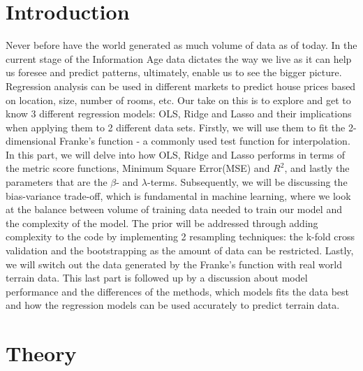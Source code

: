 \documentclass[aps,rmp,reprint,amsmath,amssymb,graphicx,longbibliography]{revtex4-1}
\begin{document}
\maketitle
\def\thefootnote{*}\def\thefootnote{\arabic{footnote}}



\section{Introduction}

    Never before have the world generated as much volume of data as of today. In the current stage of the Information Age data dictates the way we live as it can help us foresee and predict patterns, ultimately, enable us to see the bigger picture. Regression analysis can be used in different markets to predict house prices based on location, size, number of rooms, etc.
    Our take on this is to explore and get to know 3 different regression models: OLS, Ridge and Lasso and their implications when applying them to 2 different data sets.
    Firstly, we will use them to fit the 2-dimensional Franke's function - a commonly used test function for interpolation. In this part, we will delve into how OLS, Ridge and Lasso performs in terms of the metric score functions, Minimum Square Error(MSE) and $R^2$, and lastly the parameters that are the $\beta$- and $\lambda$-terms. Subsequently, we will be discussing the bias-variance trade-off, which is fundamental in machine learning, where we look at the balance between volume of training data needed to train our model and the complexity of the model\cite{lectureNotes2024}. The prior will be addressed through adding complexity to the code by implementing 2 resampling techniques: the k-fold cross validation and the bootstrapping as the amount of data can be restricted.
    Lastly, we will switch out the data generated by the Franke's function with real world terrain data. This last part is followed up by a discussion about model performance and the differences of the methods, which models fits the data best
    and how the regression models can be used accurately to predict terrain data.

\section{Theory}
\end{document}
